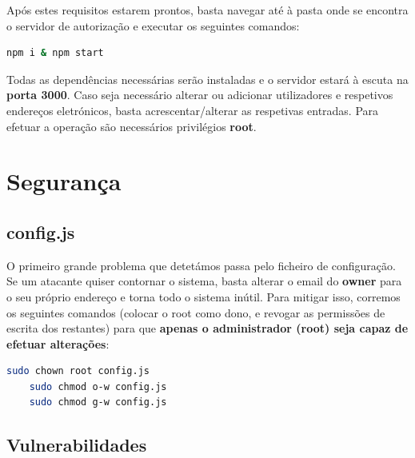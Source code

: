 Após estes requisitos estarem prontos, basta navegar até à pasta onde se encontra o servidor de autorização e executar os seguintes comandos:

\begin{lstlisting}[language=bash]
    npm i & npm start
\end{lstlisting}

Todas as dependências necessárias serão instaladas e o servidor estará à escuta na \textbf{porta 3000}. Caso seja necessário alterar ou adicionar utilizadores e respetivos endereços eletrónicos, basta acrescentar/alterar as respetivas entradas. Para efetuar a operação são necessários privilégios \textbf{root}. 

\section{Segurança}

\subsection{config.js}

O primeiro grande problema que detetámos passa pelo ficheiro de configuração. Se um atacante quiser contornar o sistema, basta alterar o email do \textbf{owner} para o seu próprio endereço e torna todo o sistema inútil. Para mitigar isso, corremos os seguintes comandos (colocar o root como dono, e revogar as permissões de escrita dos restantes) para que \textbf{apenas o administrador (root) seja capaz de efetuar alterações}:

\begin{lstlisting}[language=bash, basicstyle=\small]
    sudo chown root config.js
    sudo chmod o-w config.js
    sudo chmod g-w config.js 
\end{lstlisting}

\subsection{Vulnerabilidades}

